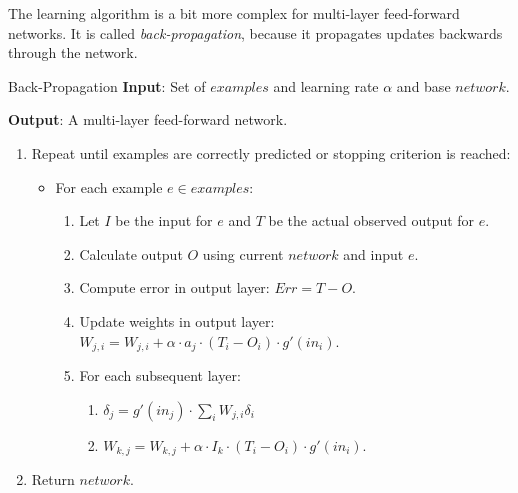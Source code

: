 \documentclass[english]{panikzettel}
\begin{document}
The learning algorithm is a bit more complex for multi-layer feed-forward networks.
It is called \emph{back-propagation}, because it propagates updates backwards through the network.

\begin{algo}{Back-Propagation}
\textbf{Input}: Set of $examples$ and learning rate $\alpha$ and base $network$.

\textbf{Output}: A multi-layer feed-forward network.
\tcblower
\begin{enumerate}
    \item Repeat until examples are correctly predicted or stopping criterion is reached:
        \begin{itemize}
            \item For each example $e \in examples$:
                \begin{enumerate}
                    \item Let $I$ be the input for $e$ and $T$ be the actual observed output for $e$.
                    \item Calculate output $O$ using current $network$ and input $e$.
                    \item Compute error in output layer: $Err = T - O$.
                    \item Update weights in output layer: $W_{j,i} = W_{j,i} + \alpha \cdot a_j \cdot (T_i - O_i) \cdot g'(in_i)$.
                    \item For each subsequent layer:
                        \begin{enumerate}
                            \item $\delta_j = g'(in_j) \cdot \sum_i W_{j,i} \delta_i$
                            \item $W_{k,j} = W_{k,j} + \alpha \cdot I_k \cdot (T_i - O_i) \cdot g'(in_i)$.
                        \end{enumerate}
                \end{enumerate}
        \end{itemize}
    \item Return $network$.
\end{enumerate}
\end{algo}
\end{document}
